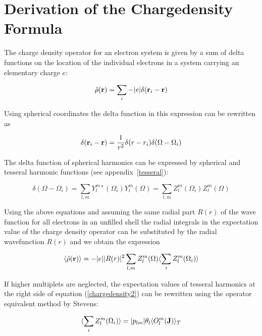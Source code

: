 \newpage
\section{Derivation of the Chargedensity Formula}\label{chargedensityoperator}
 
 The charge density operator for an electron system is given by a sum of delta
 functions on the location of the individual electrons in a system carrying
an elementary charge $e$:
 
 \begin{equation}
 \hat\rho(\mathbf r) = \sum_i -|e| \delta(\mathbf r_i - \mathbf r)
 \end{equation} 
 
 Using spherical coordinates the delta function in this expression can be rewritten as
 
 \begin{equation}
 \delta(\mathbf r_i - \mathbf r) = \frac{1}{r^2}\delta(r-r_i) \delta(\Omega- \Omega_i)
 \end{equation} 
 
 The delta function of spherical harmonics can be expressed by spherical and tesseral harmonic
 functions (see appendix~\ref{tesseral}):
 
 \begin{equation}
  \delta(\Omega- \Omega_i)= \sum_{l,m} Y_l^{m\star}(\Omega_i) Y_l^{m}(\Omega)= \sum_{l,m} Z_l^{m}(\Omega_i) Z_l^{m}(\Omega)
 \end{equation} 
 
 Using the above equations and assuming the same radial part $R(r)$ of the wave function for all electrons in an unfilled %
shell the radial integrals in the expectation value of the charge density operator can be substituted by the radial %
wavefunction $R(r)$ and we obtain the expression
 
  \begin{equation}\label{chargedensity2}
	       \langle \hat\rho(\mathbf r)\rangle=
	       -|e|  |R(r)|^2 \sum_{l,m}Z_l^{m}(\Omega) \langle\sum_i Z_l^{m}(\Omega_i)\rangle
   \end{equation} 

If higher multiplets are neglected, 
the expectation values of tesseral harmonics at the right side of equation (\ref{chargedensity2}) can
be rewritten using the operator equivalent method by Stevens\cite{hutchings64-227}:

  \begin{equation}\label{chargedensity_coefficients}
	      \langle\sum_i Z_l^{m}(\Omega_i)\rangle = |p_{lm}| \theta_{l} \langle O_l^m(\mathbf J)\rangle_T 
	      \end{equation} 

